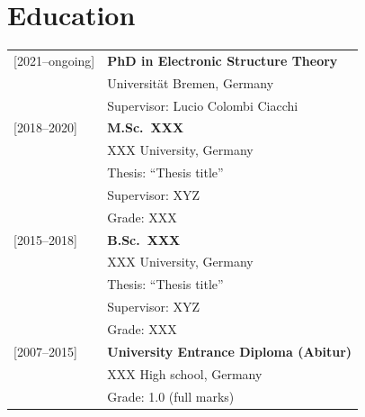     \section*{Education}
        \begin{tabular}{lp{10cm}}
        [2021--ongoing] & \textbf{PhD in Electronic Structure Theory} \\
                     & Universität Bremen, Germany \\
                     & Supervisor: Lucio Colombi Ciacchi \\ \hline
        
        [2018--2020] & \textbf{M.Sc.~XXX} \\
                     & XXX University, Germany \\
                     & Thesis: ``Thesis title'' \\
                     & Supervisor: XYZ \\
                     & Grade: XXX \\ \hline
        
        [2015--2018] & \textbf{B.Sc.~XXX} \\
                     & XXX University, Germany \\
                     & Thesis: ``Thesis title'' \\
                     & Supervisor: XYZ \\
                     & Grade: XXX \\ \hline
                     
        [2007--2015] & \textbf{University Entrance Diploma (Abitur)} \\
                     & XXX High school, Germany \\
                     & Grade: 1.0 (full marks) \\ 
        \end{tabular}
        
